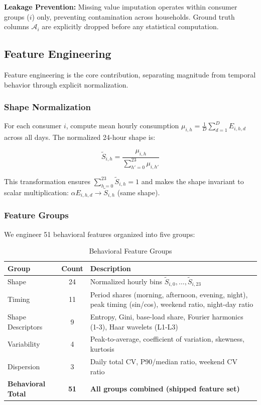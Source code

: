 \textbf{Leakage Prevention:} Missing value imputation operates within consumer groups ($i$) only, preventing contamination across households. Ground truth columns $\mathcal{A}_i$ are explicitly dropped before any statistical computation.

\subsection{Feature Engineering}
\label{sec:features}

Feature engineering is the core contribution, separating magnitude from temporal behavior through explicit normalization.

\subsubsection{Shape Normalization}

For each consumer $i$, compute mean hourly consumption $\mu_{i,h} = \frac{1}{D} \sum_{d=1}^{D} E_{i,h,d}$ across all days. The normalized 24-hour shape is:

\begin{equation}
\tilde{S}_{i,h} = \frac{\mu_{i,h}}{\sum_{h'=0}^{23} \mu_{i,h'}}
\end{equation}

This transformation ensures $\sum_{h=0}^{23} \tilde{S}_{i,h} = 1$ and makes the shape invariant to scalar multiplication: $\alpha E_{i,h,d} \rightarrow \tilde{S}_{i,h}$ (same shape).

\subsubsection{Feature Groups}

We engineer 51 behavioral features organized into five groups:

\begin{table}[h]
\centering
\small
\caption{Behavioral Feature Groups}
\label{tab:feature_groups}
\begin{tabular}{@{}lcp{7cm}@{}}
\toprule
Group & Count & Description \\
\midrule
Shape & 24 & Normalized hourly bins $\tilde{S}_{i,0}, \ldots, \tilde{S}_{i,23}$ \\
Timing & 11 & Period shares (morning, afternoon, evening, night), peak timing (sin/cos), weekend ratio, night-day ratio \\
Shape Descriptors & 9 & Entropy, Gini, base-load share, Fourier harmonics (1-3), Haar wavelets (L1-L3) \\
Variability & 4 & Peak-to-average, coefficient of variation, skewness, kurtosis \\
Dispersion & 3 & Daily total CV, P90/median ratio, weekend CV ratio \\
\midrule
\textbf{Behavioral Total} & \textbf{51} & \textbf{All groups combined (shipped feature set)} \\
\bottomrule
\end{tabular}
\end{table}

